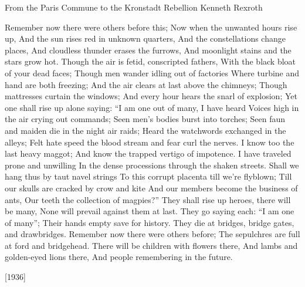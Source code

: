 \begin{poem}
    {From the Paris Commune to
    the Kronstadt Rebellion}
    {Kenneth Rexroth} 

    Remember now there were others before this; 
    Now when the unwanted hours rise up, 
    And the sun rises red in unknown quarters, 
    And the constellations change places, 
    And cloudless thunder erases the furrows, 
    And moonlight stains and the stars grow hot. 
    Though the air is fetid, conscripted fathers, 
    With the black bloat of your dead faces; 
    Though men wander idling out of factories 
    Where turbine and hand are both freezing; 
    And the air clears at last above the chimneys; 
    Though mattresses curtain the windows; 
    And every hour hears the snarl of explosion; 
    Yet one shall rise up alone saying: 
    ``I am one out of many, I have heard 
    Voices high in the air crying out commands; 
    Seen men's bodies burst into torches; 
    Seen faun and maiden die in the night air raids; 
    Heard the watchwords exchanged in the alleys; 
    Felt hate speed the blood stream and fear curl the nerves. 
    I know too the last heavy maggot; 
    And know the trapped vertigo of impotence. 
    I have traveled prone and unwilling 
    In the dense processions through the shaken streets. 
    Shall we hang thus by taut navel strings 
    To this corrupt placenta till we're flyblown; 
    Till our skulls are cracked by crow and kite 
    And our members become the business of ants, 
    Our teeth the collection of magpies?'' 
    They shall rise up heroes, there will be many, 
    None will prevail against them at last. 
    They go saying each: ``I am one of many''; 
    Their hands empty save for history. 
    They die at bridges, bridge gates, and drawbridges. 
    Remember now there were others before; 
    The sepulchres are full at ford and bridgehead. 
    There will be children with flowers there, 
    And lambs and golden-eyed lions there, 
    And people remembering in the future. 

\hfill                                                                   [1936] 
\end{poem}



